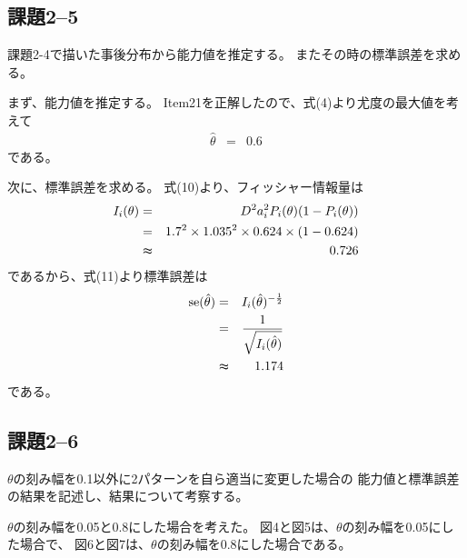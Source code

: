 \documentclass[12pt]{jarticle}
\begin{document}
\subsection{課題2–5}
\begin{shadebox}
    課題2-4で描いた事後分布から能力値を推定する。
    またその時の標準誤差を求める。
\end{shadebox}

まず、能力値を推定する。
Item21を正解したので、式(4)より尤度の最大値を考えて
\begin{eqnarray}
    \hat{\theta}&=&0.6 \nonumber
\end{eqnarray}
である。

次に、標準誤差を求める。
式(10)より、フィッシャー情報量は
\begin{eqnarray}
    I_i(\theta)&=&D^2a_i^2 P_i(\theta)(1-P_i(\theta)) \nonumber\\
    &=&1.7^2 \times 1.035^2\times 0.624\times (1-0.624) \nonumber\\
    &\thickapprox& 0.726 \nonumber
\end{eqnarray}
であるから、式(11)より標準誤差は
\begin{eqnarray}
    {\rm se}(\hat{\theta})&=&I_i(\hat{\theta})^{-\frac{1}{2}} \nonumber\\
    &=&\frac{1}{\sqrt{I_i(\hat{\theta})}}\nonumber\\
    &\thickapprox&1.174\nonumber
\end{eqnarray}
である。

\clearpage
\subsection{課題2–6}
\begin{shadebox}
    $\theta$の刻み幅を0.1以外に2パターンを自ら適当に変更した場合の
    能力値と標準誤差の結果を記述し、結果について考察する。
\end{shadebox}

$\theta$の刻み幅を0.05と0.8にした場合を考えた。
図4と図5は、$\theta$の刻み幅を0.05にした場合で、
図6と図7は、$\theta$の刻み幅を0.8にした場合である。
\end{document}
